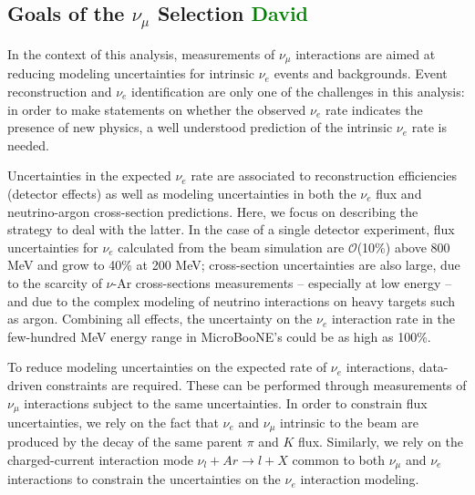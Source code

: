 \documentclass[a4paper]{article}
\begin{document}
\subsection{Goals of the $\nu_{\mu}$ Selection \textcolor{green}{David}}
\label{ssec:goalsofnumusel}

\par In the context of this analysis, measurements of $\nu_{\mu}$ interactions are aimed at reducing modeling uncertainties for intrinsic $\nu_e$ events and backgrounds. Event reconstruction and $\nu_e$ identification are only one of the challenges in this analysis:  in order to make statements on whether the observed $\nu_e$ rate indicates the presence of new physics, a well understood prediction of the intrinsic $\nu_e$ rate is needed. 

\par Uncertainties in the expected $\nu_e$ rate are associated to reconstruction efficiencies (detector effects) as well as modeling uncertainties in both the $\nu_e$ flux  and neutrino-argon cross-section predictions. Here, we focus on describing the strategy to deal with the latter. In the case of a single detector experiment, %
flux uncertainties for $\nu_e$ calculated from the beam simulation are $\mathcal{O}$(10\%) above 800 MeV and grow to 40\% at 200 MeV;  cross-section uncertainties are also large, due to the scarcity of $\nu$-Ar cross-sections measurements -- especially at low energy -- and due to the complex modeling of neutrino interactions on heavy targets such as argon. Combining all effects, the uncertainty on the $\nu_e$ interaction rate in the few-hundred MeV energy range in MicroBooNE's could be as high as 100\%.
\par To reduce modeling uncertainties on the expected rate of $\nu_e$ interactions, data-driven constraints are required. These can be performed through measurements of $\nu_{\mu}$ interactions subject to the same uncertainties. In order to constrain flux uncertainties, we rely on the fact that $\nu_e$ and $\nu_{\mu}$ intrinsic to the beam are produced by the decay of the same parent $\pi$ and $K$ flux. Similarly, we rely on the charged-current interaction mode $\nu_{l} + Ar \rightarrow l + X$ common to both $\nu_{\mu}$ and $\nu_e$ interactions to constrain the uncertainties on the $\nu_e$ interaction modeling.
\end{document}

